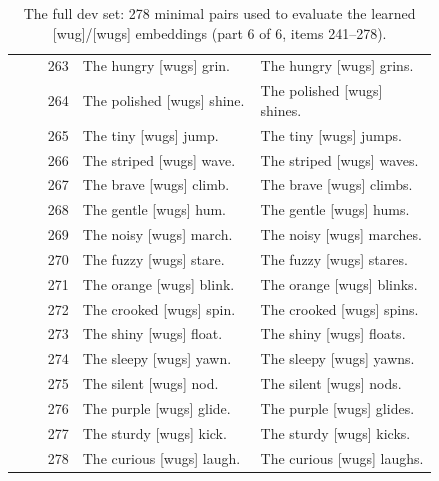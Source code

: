 \begin{table}[p]
\begin{tabular}{@{}rp{0.42\linewidth}p{0.42\linewidth}@{}}
263 & The hungry {[}wugs{]} grin. & The hungry {[}wugs{]} grins. \\
264 & The polished {[}wugs{]} shine. & The polished {[}wugs{]} shines. \\
265 & The tiny {[}wugs{]} jump. & The tiny {[}wugs{]} jumps. \\
266 & The striped {[}wugs{]} wave. & The striped {[}wugs{]} waves. \\
267 & The brave {[}wugs{]} climb. & The brave {[}wugs{]} climbs. \\
268 & The gentle {[}wugs{]} hum. & The gentle {[}wugs{]} hums. \\
269 & The noisy {[}wugs{]} march. & The noisy {[}wugs{]} marches. \\
270 & The fuzzy {[}wugs{]} stare. & The fuzzy {[}wugs{]} stares. \\
271 & The orange {[}wugs{]} blink. & The orange {[}wugs{]} blinks. \\
272 & The crooked {[}wugs{]} spin. & The crooked {[}wugs{]} spins. \\
273 & The shiny {[}wugs{]} float. & The shiny {[}wugs{]} floats. \\
274 & The sleepy {[}wugs{]} yawn. & The sleepy {[}wugs{]} yawns. \\
275 & The silent {[}wugs{]} nod. & The silent {[}wugs{]} nods. \\
276 & The purple {[}wugs{]} glide. & The purple {[}wugs{]} glides. \\
277 & The sturdy {[}wugs{]} kick. & The sturdy {[}wugs{]} kicks. \\
278 & The curious {[}wugs{]} laugh. & The curious {[}wugs{]} laughs. \\
\hline
\end{tabular}
\caption{The full dev set: 278 minimal pairs used to evaluate the learned {[}wug{]}/{[}wugs{]} embeddings (part 6 of 6, items 241--278).}
\label{tab:dev-set-6}
\end{table}
